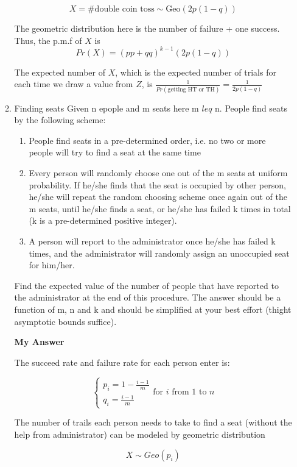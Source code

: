 \documentclass{article}
\begin{document}
\begin{enumerate}
\begin{enumerate}[label*=\arabic*.]
$$X = \text{\#double coin toss} \sim \text{Geo}(2p(1-q))$$

The geometric distribution here is the number of failure + one success. Thus, the p.m.f of $X$ is 
$$Pr(X) = (pp+qq)^{k-1}(2p(1-q))$$

The expected number of $X$, which is the expected number of trials for each time we draw a value from $Z$, is $\frac{1}{Pr(\text{getting HT or TH})} = \frac{1}{2p(1-q)}$

\gap
\item Finding seats
Given n epople and m seats here m $leq$ n. People find seats by the following scheme:

\begin{enumerate}[label=(\roman*)]
\item People find seats in a pre-determined order, i.e. no two or more people will try to find a seat at the same time
\item Every person will randomly choose one out of the m seats at uniform probability. If he/she finds that the seat is occupied by other person, he/she will repeat the random choosing scheme once again out of the m seats, until he/she finds a seat, or he/she has failed k times in total (k is a pre-determined positive integer).
\item A person will report to the administrator once he/she has failed k times, and the administrator will randomly assign an unoccupied seat for him/her.
\end{enumerate}
Find the expected value of the number of people that have reported to the administrator at the end of this procedure. The answer should be a function of m, n and k and should be simplified at your best effort (thight asymptotic bounds suffice).
\gap

\textbf{My Answer}

The succeed rate and failure rate for each person enter is:

$$
\begin{cases}
p_i = 1 - \frac{i-1}{m} \\
q_i = \frac{i-1}{m}
\end{cases}
\text{for $i$ from 1 to $n$}
$$

The number of trails each person needs to take to find a seat (without the help from administrator) can be modeled by geometric distribution

$$X \sim Geo(p_i)$$


\end{enumerate}
\end{enumerate}
\end{document}
